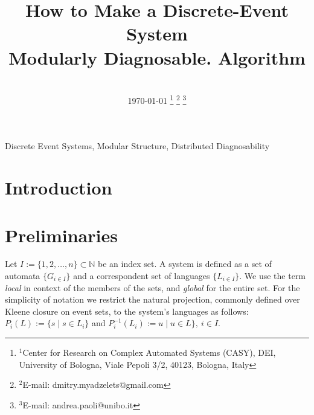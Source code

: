 \documentclass[a4paper, 10pt, conference]{ieeeconf}
\begin{document}
\title{How to Make a Discrete-Event System \\ Modularly Diagnosable.
Algorithm} 
\author{
	\\ \today
	\thanks{$^{1}$Center for Research on Complex Automated Systems (CASY), DEI,
	University of Bologna, Viale Pepoli 3/2, 40123, Bologna, Italy}
		\thanks{$^{2}$E-mail: {dmitry.myadzelets@gmail.com}}
		\thanks{$^{3}$E-mail: {andrea.paoli@unibo.it}}
}
\maketitle


\begin{abstract}

\end{abstract}

\begin{keywords}
Discrete Event Systems, Modular Structure, Distributed Diagnosability
\end{keywords}

\newtheorem{theorem}{Theorem}
\newtheorem{definition}{Definition}
\newtheorem{lemma}{Lemma}
\newtheorem{assumption}{Assumption}
\newtheorem{corollary}{Corollary}
\newtheorem{example}{Example}  


\section{Introduction}


\section{Preliminaries}
\label{sec:Preliminaries}
Let $I := \{1,2,\ldots,n\} \subset  \mathbb{N}$ be an index set. A system is
defined as a set of automata $\{G_{i \in I}\}$ and a correspondent set
of languages $\{L_{i \in I}\}$. We use the term \emph{local} in context
of the members of the sets, and \emph{global} for the entire set.
For the simplicity of notation we restrict the natural projection, commonly
defined over Kleene closure on event sets, to the system's languages as
follows: $P_i(L) := \{s\mid s\in L_{i}\}$ and $P_i^{-1}(L_{i}) := u \mid u
\in L\}, ~i \in I$.
\end{document}
